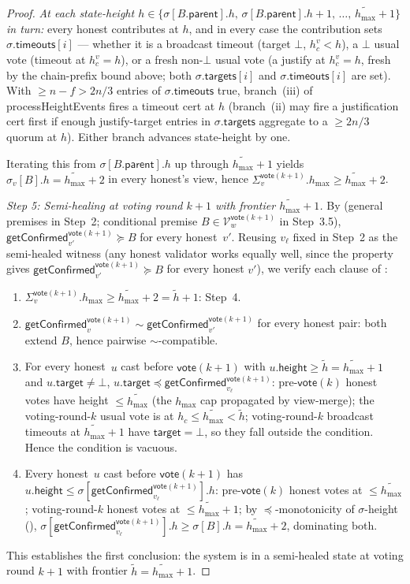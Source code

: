 \ifx\litemode\undefined\documentclass{article}\fi
\newcommand{\V}[0]{\ensuremath{\mathcal{V}}}
\newcommand{\target}{\mathsf{target}}
\newcommand{\height}{\mathsf{height}}
\newcommand{\parent}{\mathsf{parent}}
\newcommand{\targets}{\mathsf{targets}}
\newcommand{\timeouts}{\mathsf{timeouts}}
\newcommand{\hmax}{\ensuremath{h_{\max}}\xspace}
\newcommand{\processHeightEvents}{\textsf{processHeightEvents}\xspace}
\newcommand{\vote}{\ensuremath{\mathsf{vote}}}
\newcommand{\comm}[1]{\ensuremath{\widetilde{#1}}}
\newcommand{\getConfirmed}{\textsf{getConfirmed}\xspace}
\theoremstyle{plain}
\theoremstyle{definition}
\theoremstyle{remark}
\begin{document}
\begin{proof}
\emph{At each state-height $h \in \{\sigma[B.\parent].h,\, \sigma[B.\parent].h + 1,\, \ldots,\, \comm{\hmax}+1\}$ in turn:} every honest contributes at $h$, and in every case the contribution sets $\sigma.\timeouts[i]$ — whether it is a broadcast timeout (target $\bot$, $h_c^v < h$), a $\bot$ usual vote (timeout at $h_c^v = h$), or a fresh non-$\bot$ usual vote (a justify at $h_c^v = h$, fresh by the chain-prefix bound above; both $\sigma.\targets[i]$ and $\sigma.\timeouts[i]$ are set). With $\geq n - f > 2n/3$ entries of $\sigma.\timeouts$ true, branch~(iii) of \processHeightEvents{} fires a timeout cert at $h$ (branch~(ii) may fire a justification cert first if enough justify-target entries in $\sigma.\targets$ aggregate to a $\geq 2n/3$ quorum at $h$). Either branch advances state-height by one.

Iterating this from $\sigma[B.\parent].h$ up through $\comm{\hmax}+1$ yields $\sigma_v[B].h = \comm{\hmax}+2$ in every honest's view, hence $\Sigma_v^{\vote(k+1)}.\hmax \geq \comm{\hmax}+2$.

\emph{Step 5: Semi-healing at voting round $k+1$ with frontier $\comm{\hmax}+1$.}
By  (general premises in Step~2; conditional premise $B \in \V_w^{\vote(k+1)}$ in Step~3.5), $\getConfirmed_{v'}^{\vote(k+1)} \succeq B$ for every honest~$v'$. Reusing $v_\ell$ fixed in Step~2 as the semi-healed witness (any honest validator works equally well, since the property gives $\getConfirmed_{v'}^{\vote(k+1)} \succeq B$ for every honest $v'$), we verify each clause of :
\begin{enumerate}
  \item $\Sigma_v^{\vote(k+1)}.\hmax \geq \comm{\hmax}+2 = \comm{h}+1$: Step~4.
  \item $\getConfirmed_v^{\vote(k+1)} \sim \getConfirmed_{v'}^{\vote(k+1)}$ for every honest pair: both extend $B$, hence pairwise $\sim$-compatible.
  \item For every honest~$u$ cast before $\vote(k+1)$ with $u.\height \geq \comm{h} = \comm{\hmax}+1$ and $u.\target \neq \bot$, $u.\target \preceq \getConfirmed_{v_\ell}^{\vote(k+1)}$: pre-$\vote(k)$ honest votes have height $\leq \comm{\hmax}$ (the $\hmax$ cap propagated by view-merge); the voting-round-$k$ usual vote is at $h_c \leq \comm{\hmax} < \comm{h}$; voting-round-$k$ broadcast timeouts at $\comm{\hmax}+1$ have $\target = \bot$, so they fall outside the condition. Hence the condition is vacuous.
  \item Every honest~$u$ cast before $\vote(k+1)$ has $u.\height \leq \sigma[\getConfirmed_{v_\ell}^{\vote(k+1)}].h$: pre-$\vote(k)$ honest votes at $\leq \comm{\hmax}$; voting-round-$k$ honest votes at $\leq \comm{\hmax}+1$; by $\preceq$-monotonicity of $\sigma$-height (), $\sigma[\getConfirmed_{v_\ell}^{\vote(k+1)}].h \geq \sigma[B].h = \comm{\hmax}+2$, dominating both.
\end{enumerate}
This establishes the first conclusion: the system is in a semi-healed state at voting round $k+1$ with frontier $\comm{h} = \comm{\hmax}+1$.


\end{proof}
\end{document}
